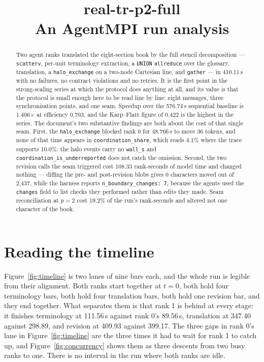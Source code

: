 \documentclass[11pt]{article}
\title{\textbf{real-tr-p2-full}\\[2pt]\large An AgentMPI run analysis}
\author{}
\date{}
\begin{document}
\maketitle

\begin{abstract}
Two agent ranks translated the eight-section book by the full stencil decomposition ---
\texttt{scatterv}, per-unit terminology extraction, a \texttt{UNION} \texttt{allreduce} over the
glossary, translation, a \texttt{halo\_exchange} on a two-node Cartesian line, and
\texttt{gather} --- in 410.11\,s with no failures, no contract violations and no retries. It is
the first point in the strong-scaling series at which the protocol does anything at all, and its
value is that the protocol is small enough here to be read line by line: eight messages, three
synchronisation points, and one seam. Speedup over the 576.74\,s sequential baseline is
1.406$\times$ at efficiency 0.703, and the Karp--Flatt figure of 0.422 is the highest in the
series. The document's two substantive findings are both about the cost of that single seam.
First, the \texttt{halo\_exchange} blocked rank 0 for 48.766\,s to move 36 tokens, and none of
that time appears in \texttt{coordination\_share}, which reads 4.1\% where the trace supports
10.0\%: the halo events carry no \texttt{wall\_s} and \texttt{coordination\_is\_underreported}
does not catch the omission. Second, the two revision calls the seam triggered cost 108.33
rank-seconds of model time and changed nothing --- diffing the pre- and post-revision blobs gives
0 characters moved out of 2{,}437, while the harness reports \texttt{n\_boundary\_changes: 7},
because the agents used the \texttt{changes} field to list checks they performed rather than edits
they made. Seam reconciliation at $p=2$ cost 19.2\% of the run's rank-seconds and altered not one
character of the book.
\end{abstract}



\section{Reading the timeline}

Figure~\ref{fig:timeline} is two lanes of nine bars each, and the whole run is legible from their
alignment. Both ranks start together at $t=0$, both hold four terminology bars, both hold four
translation bars, both hold one revision bar, and they end together. What separates them is that
rank 1 is behind at every stage: it finishes terminology at 111.56\,s against rank 0's 89.56\,s,
translation at 347.40 against 298.89, and revision at 409.93 against 399.17. The three gaps in
rank 0's lane in Figure~\ref{fig:timeline} are the three times it had to wait for rank 1 to catch
up, and Figure~\ref{fig:concurrency} shows them as three descents from two busy ranks to one.
There is no interval in the run where both ranks are idle.
\end{document}

